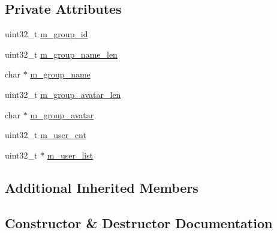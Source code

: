 \subsection*{Private Attributes}
\begin{DoxyCompactItemize}
\item 
uint32\+\_\+t \hyperlink{class_c_im_pdu_group_create_normal_group_notify_aa49e7f094ca6777f4be4c1d939b16b23}{m\+\_\+group\+\_\+id}
\item 
uint32\+\_\+t \hyperlink{class_c_im_pdu_group_create_normal_group_notify_a7fa141fc1b7d8e2599d68d7563135857}{m\+\_\+group\+\_\+name\+\_\+len}
\item 
char $\ast$ \hyperlink{class_c_im_pdu_group_create_normal_group_notify_a8a641c80ef96acb3e33d23e4d585384c}{m\+\_\+group\+\_\+name}
\item 
uint32\+\_\+t \hyperlink{class_c_im_pdu_group_create_normal_group_notify_a11c71c2b3d32f6d570d9a8bf1d32bf0a}{m\+\_\+group\+\_\+avatar\+\_\+len}
\item 
char $\ast$ \hyperlink{class_c_im_pdu_group_create_normal_group_notify_af6e5d3b07441f9842b044dc754fc5234}{m\+\_\+group\+\_\+avatar}
\item 
uint32\+\_\+t \hyperlink{class_c_im_pdu_group_create_normal_group_notify_af79bc1c43b3d87f7447cdd5dda58957b}{m\+\_\+user\+\_\+cnt}
\item 
uint32\+\_\+t $\ast$ \hyperlink{class_c_im_pdu_group_create_normal_group_notify_ac9cc8ae58942dcf6a4e67f6bfa56780a}{m\+\_\+user\+\_\+list}
\end{DoxyCompactItemize}
\subsection*{Additional Inherited Members}


\subsection{Constructor \& Destructor Documentation}
\hypertarget{class_c_im_pdu_group_create_normal_group_notify_a4c9cfacf809aa8cb13e191691ab2d55b}{}
